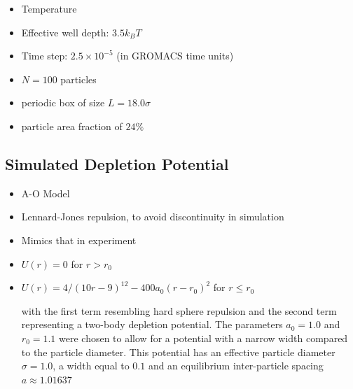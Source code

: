 \documentclass{umthesis}          %
\begin{document}
\begin{itemize}
\item Temperature\\
\label{sec-2.3.3.4}


\item Effective well depth: $3.5 k_B T$\\
\label{sec-2.3.3.5}


\item Time step: $2.5 \times 10^{-5}$ (in GROMACS time units)\\
\label{sec-2.3.3.6}


\item $N=100$ particles\\
\label{sec-2.3.3.7}


\item periodic box of size $L = 18.0 \sigma$\\
\label{sec-2.3.3.8}


\item particle area fraction of $24\%$\\
\label{sec-2.3.3.9}


\end{itemize} %
\subsection{Simulated Depletion Potential}
\label{sec-2.3.4}

\begin{itemize}

\item A-O Model\\
\label{sec-2.3.4.1}


\item Lennard-Jones repulsion, to avoid discontinuity in simulation\\
\label{sec-2.3.4.2}


\item Mimics that in experiment\\
\label{sec-2.3.4.3}


\item $U(r)=0$ for $r > r_0$\\
\label{sec-2.3.4.4}


\item $U(r)=4/(10r-9)^{12} -  400 a_0 (r-r_0)^2$ for $r \le r_0$\\
\label{sec-2.3.4.5}

with the first term resembling hard sphere repulsion and the second term  representing a two-body depletion potential. The parameters $a_0=1.0$ and $r_0=1.1$ were chosen to allow for  a potential with a narrow width compared to the particle diameter. This potential has an effective particle diameter $\sigma=1.0$,  a width equal to $0.1$ and an equilibrium inter-particle spacing $a \approx 1.01637$

\end{itemize} %
\end{document}
